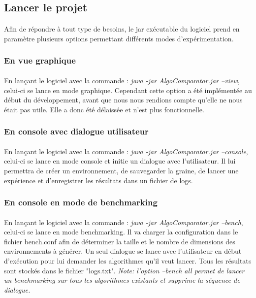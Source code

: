 \documentclass[pidr]{tnreport}
\begin{document}
							
		\subsection{Lancer le projet}

\paragraph{}
Afin de répondre à tout type de besoins, le jar exécutable du logiciel prend en paramètre plusieurs options permettant différents modes d'expérimentation.

			\subsubsection{En vue graphique}

\paragraph{}
En lançant le logiciel avec la commande : \emph{java -jar AlgoComparator.jar --view}, celui-ci se lance en mode graphique. Cependant cette option a été implémentée au début du développement, avant que nous nous rendions compte qu'elle ne nous était pas utile. Elle a donc été délaissée et n'est plus fonctionnelle.

			\subsubsection{En console avec dialogue utilisateur}

\paragraph{}
En lançant le logiciel avec la commande : \emph{java -jar AlgoComparator.jar --console}, celui-ci se lance en mode console et initie un dialogue avec l'utilisateur. Il lui permettra de créer un environnement, de sauvegarder la graine, de lancer une expérience et d'enregistrer les résultats dans un fichier de logs.

			\subsubsection{En console en mode de benchmarking}
			
\paragraph{}
En lançant le logiciel avec la commande : \emph{java -jar AlgoComparator.jar --bench}, celui-ci se lance en mode benchmarking. Il va charger la configuration dans le fichier bench.conf afin de déterminer la taille et le nombre de dimensions des environnements à générer. Un seul dialogue se lance avec l'utilisateur en début d'exécution pour lui demander les algorithmes qu'il veut lancer. Tous les résultats sont stockés dans le fichier "logs.txt". \linebreak
\emph{Note: l'option --bench all permet de lancer un benchmarking sur tous les algorithmes existants et supprime la séquence de dialogue.}
			
\end{document}
